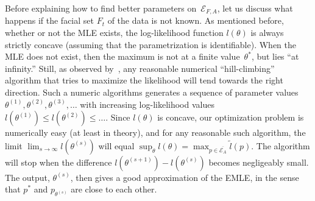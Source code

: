 \documentclass[aos,noinfoline]{imsart}
\newcommand{\Ecal}{\mathcal{E}}
\newcommand{\ol}[1]{\overline{#1}}
\theoremstyle{remark}
\theoremstyle{definition}
\begin{document}
Before explaining how to find better parameters on~$\Ecal_{F,A}$, let us discuss what happens if the facial set $F_{t}$
of the data is not known.  As mentioned before, whether or not the MLE exists, the log-likelihood function
$l(\theta)$ %
is always strictly concave (assuming that the parametrization is identifiable).  When the MLE does not exist, then the
maximum is not at a finite value~$\theta^{*}$, but lies ``at infinity.''  Still, as observed
by~\citet[Section~3.15]{Geyer09:Likelihood_inference_in_exponential_families}, any reasonable numerical
``hill-climbing'' algorithm that tries to maximize the likelihood will tend towards the right direction.  Such a numeric
algorithms generates a sequence of parameter values $\theta^{(1)},\theta^{(2)},\theta^{(3)},\dots$ with increasing
log-likelihood values~$l(\theta^{(1)})\le l(\theta^{(2)})\le\dots$.  Since $l(\theta)$ is concave, our optimization
problem is numerically easy (at least in theory), and for any reasonable such algorithm, the limit
$\lim_{s\to\infty}l(\theta^{(s)})$ will equal $\sup_{\theta}l(\theta) = \max_{p\in\ol{\Ecal_{A}}}\tilde l(p)$.
The algorithm will stop when the difference $l(\theta^{(s+1)})-l(\theta^{(s)})$ becomes negligeably small.  The output,
$\theta^{(s)}$, then gives a good approximation of the EMLE, in the sense that $p^{*}$ and $p_{\theta^{(s)}}$ are close
to each other.
\end{document}

